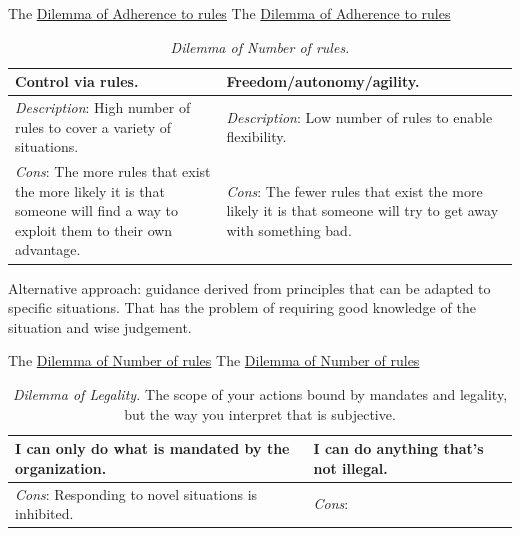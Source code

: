 The \href{table:rule-adherence}{Dilemma of Adherence to rules}
The \href{table:rule-adherence}{Dilemma of Adherence to rules}



\begin{center}
\begin{table}[H] %
\begin{tabular}{ | m{\dilemmatablewidth}| m{\dilemmatablewidth} | } 
  \hline
  \textbf{Control via rules.} & \textbf{Freedom/autonomy/agility.} \\ 
  \hline
  \textit{Description}: High number of rules to cover a variety of situations. & 
  \textit{Description}: Low number of rules to enable flexibility. \\ 
  \hline
  \textit{Cons}: The more rules that exist the more likely it is that someone will find a way to exploit them to their own advantage. & 
  \textit{Cons}: The fewer rules that exist the more likely it is that someone will try to get away with something bad. \\  
  \hline
\end{tabular}
\caption{
\textit{Dilemma of Number of rules.}
}
\label{table:number-of-rules}
\end{table}
\end{center}
Alternative approach: guidance derived from principles that can be adapted to specific situations. That has the problem of requiring good knowledge of the situation and wise judgement.

The \href{table:number-of-rules}{Dilemma of Number of rules}
The \href{table:number-of-rules}{Dilemma of Number of rules}


\begin{center}
\begin{table}[H] %
\begin{tabular}{ | m{\dilemmatablewidth}| m{\dilemmatablewidth} | } 
  \hline
  \textbf{I can only do what is mandated by the organization.} & 
  \textbf{I can do anything that's not illegal.} \\ 
  \hline
  \textit{Cons}: Responding to novel situations is inhibited. &
  \textit{Cons}:  \\  
  \hline
\end{tabular}
\caption{
\textit{Dilemma of Legality.}
The scope of your actions bound by mandates and legality, but the way you interpret that is subjective.
}
\label{table:legality}
\end{table}
\end{center}

